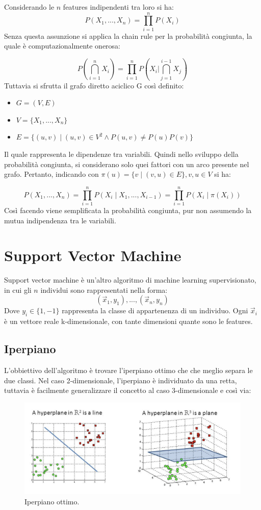 \documentclass[oneside]{book}
\begin{document}
\noindent Considerando le $n$ features indipendenti tra loro si ha:
$$P(X_1, ..., X_n) = \prod\limits_{i=1}^{n}P(X_i) $$
Senza questa assunzione si applica la chain rule per la probabilità congiunta, la quale è computazionalmente onerosa:

\[ 
P \left( \bigcap_{i=1}^n X_i \right) = 
\prod\limits_{i=1}^{n}P
\left( X_i  \bigg\vert
\bigcap_{j=1}^{i-1} X_j \right)
\]
Tuttavia si sfrutta il grafo diretto aciclico G così definito:
\begin{itemize}
	\item $G = (V, E)$
	\item $V = \{X_1, ..., X_n\}$
	\item $E = \{(u,v) \mid (u,v) \in V^2 \land P(u, v) \neq P(u)P(v) \}$
\end{itemize}
Il quale rappresenta le dipendenze tra variabili. Quindi nello sviluppo della probabilità congiunta, si considerano solo quei fattori con un arco presente nel grafo. Pertanto, indicando con $\pi(u) = \{v \mid (v, u) \in E\}, v,u \in V$ si ha:


$$P(X_1, ..., X_n) = \prod\limits_{i=1}^{n}P(X_i \mid X_1, ..., X_{i-1}) = \prod\limits_{i=1}^{n}P(X_i \mid \pi(X_i)) $$
Così facendo viene semplificata la probabilità congiunta, pur non assumendo la mutua indipendenza tra le variabili.


\section{Support Vector Machine}
Support vector machine è un'altro algoritmo di machine learning supervisionato, in cui gli $n$ individui sono rappresentati nella forma:
$$(\vec{x}_1, y_1),...,(\vec{x}_n, y_n)$$
Dove $y_i \in \{1, -1\}$ rappresenta la classe di appartenenza di un individuo. Ogni $\vec{x}_i$ è un vettore reale k-dimensionale, con tante dimensioni quante sono le features.

\subsection{Iperpiano}
L'obbiettivo dell'algoritmo è trovare l'iperpiano ottimo che che meglio separa le due classi.
Nel caso 2-dimensionale, l'iperpiano è individuato da una retta, tuttavia è facilmente generalizzare il concetto al caso 3-dimensionale e così via:
\begin{figure}[H]
	\centering
	\includegraphics[width=12cm]{assets/svm-hyperplane.png}
	\caption[Caption for LOF]{Iperpiano ottimo.\footnotemark}
	\label{fig:svm-2d}
\end{figure}
\end{document}
